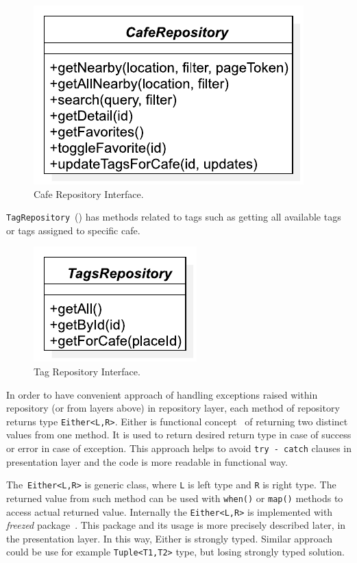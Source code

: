 \begin{figure}[ht]
    \centering
    \includegraphics[width=0.5\linewidth]{img/implementation/cafe_repository_interface.pdf}
    \caption{Cafe Repository Interface.}
    \label{fig:ct-cafe-repo-interface}
\end{figure}

\verb|TagRepository|~() has methods related to tags such as getting all available tags or tags assigned to specific cafe. 

\begin{figure}[ht]
    \centering
    \includegraphics[width=0.33\linewidth]{img/implementation/tag_repository_interface.pdf}
    \caption{Tag Repository Interface.}
    \label{fig:ct-tag-repo-interface}
\end{figure}

In order to have convenient approach of handling exceptions raised within repository (or from layers above) in repository layer, each method of repository returns type \verb|Either<L,R>|. Either is functional concept~\cite{ibm-either} of returning two distinct values from one method. It is used to return desired return type in case of success or error in case of exception. This approach helps to avoid \verb|try - catch| clauses in presentation layer and the code is more readable in functional way. 

The~\verb|Either<L,R>| is generic class, where \verb|L| is left type and \verb|R| is right type. The returned value from such method can be used with \verb|when()| or \verb|map()| methods to access actual returned value. Internally the \verb|Either<L,R>| is implemented with \textit{freezed} package~\cite{package-freezed}. This package and its usage is more precisely described later, in the presentation layer. In this way, Either is strongly typed. Similar approach could be use for example \verb|Tuple<T1,T2>| type, but losing strongly typed solution. 

